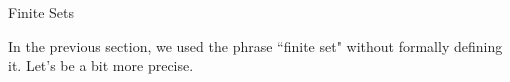 \begin{section}{Finite Sets}

In the previous section, we used the phrase ``finite set" without formally defining it. Let's be a bit more precise.



\end{section}